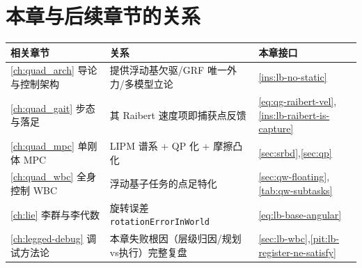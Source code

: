 \section*{本章与后续章节的关系}
\begin{table}[H]\centering\small
\begin{tabular}{lll}
\toprule
相关章节 & 关系 & 本章接口 \\
\midrule
\cref{ch:quad_arch} 导论与控制架构 & 提供浮动基欠驱/GRF 唯一外力/多模型立论 & \cref{ins:lb-no-static} \\
\cref{ch:quad_gait} 步态与落足 & 其 Raibert 速度项即捕获点反馈 & \cref{eq:qg-raibert-vel},\cref{ins:lb-raibert-is-capture} \\
\cref{ch:quad_mpc} 单刚体 MPC & LIPM 谱系 + QP 化 + 摩擦凸化 & \cref{sec:srbd},\cref{sec:qp} \\
\cref{ch:quad_wbc} 全身控制 WBC & 浮动基子任务的点足特化 & \cref{sec:qw-floating},\cref{tab:qw-subtasks} \\
\cref{ch:lie} 李群与李代数 & 旋转误差 \texttt{rotationErrorInWorld} & \cref{eq:lb-base-angular} \\
\cref{ch:legged-debug} 调试方法论 & 本章失败根因（层级归因/规划vs执行）完整复盘 & \cref{sec:lb-wbc},\cref{pit:lb-register-ne-satisfy} \\
\bottomrule
\end{tabular}
\end{table}

